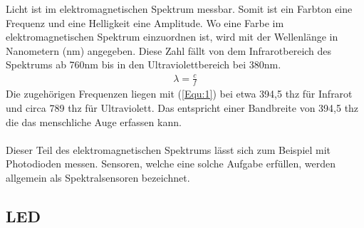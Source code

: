 \documentclass[11pt]{scrartcl}
\begin{document}
\noindent
Licht ist im elektromagnetischen Spektrum messbar. Somit ist ein Farbton eine Frequenz und eine Helligkeit eine Amplitude.
Wo eine Farbe im elektromagnetischen Spektrum einzuordnen ist, wird mit der Wellenlänge in Nanometern (nm) angegeben. Diese Zahl fällt von
dem Infrarotbereich des Spektrums ab 760nm bis in den Ultraviolettbereich bei 380nm.
\begin{align}\label{Equ:1}
    \lambda = \frac{c}{f}
\end{align}
Die zugehörigen Frequenzen liegen mit (\ref{Equ:1}) bei etwa 394,5 \ac{thz} für Infrarot und circa 789 \ac{thz} für Ultraviolett. Das entspricht einer Bandbreite
von 394,5 \ac{thz} die das menschliche Auge erfassen kann.\\
\\
Dieser Teil des elektromagnetischen Spektrums lässt sich zum Beispiel mit Photodioden messen. Sensoren, welche eine solche Aufgabe erfüllen,
werden allgemein als Spektralsensoren bezeichnet.
\clearpage

\subsection{LED}
\end{document}
